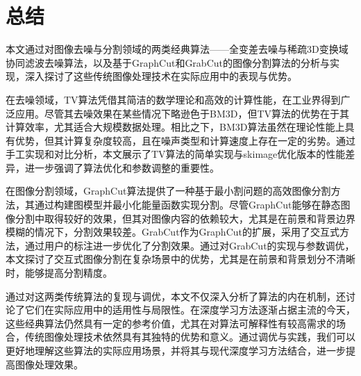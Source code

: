 \documentclass[UTF8]{ctexart}
\begin{document}
\section{总结}
本文通过对图像去噪与分割领域的两类经典算法——全变差去噪与稀疏3D变换域协同滤波去噪算法，以及基于GraphCut和GrabCut的图像分割算法的分析与实现，深入探讨了这些传统图像处理技术在实际应用中的表现与优势。\par
在去噪领域，TV算法凭借其简洁的数学理论和高效的计算性能，在工业界得到广泛应用。尽管其去噪效果在某些情况下略逊色于BM3D，但TV算法的优势在于其计算效率，尤其适合大规模数据处理。相比之下，BM3D算法虽然在理论性能上具有优势，但其计算复杂度较高，且在噪声类型和计算速度上存在一定的劣势。通过手工实现和对比分析，本文展示了TV算法的简单实现与skimage优化版本的性能差异，进一步强调了算法优化和参数调整的重要性。\par
在图像分割领域，GraphCut算法提供了一种基于最小割问题的高效图像分割方法，其通过构建图模型并最小化能量函数实现分割。尽管GraphCut能够在静态图像分割中取得较好的效果，但其对图像内容的依赖较大，尤其是在前景和背景边界模糊的情况下，分割效果较差。GrabCut作为GraphCut的扩展，采用了交互式方法，通过用户的标注进一步优化了分割效果。通过对GrabCut的实现与参数调优，本文探讨了交互式图像分割在复杂场景中的优势，尤其是在前景和背景划分不清晰时，能够提高分割精度。\par
通过对这两类传统算法的复现与调优，本文不仅深入分析了算法的内在机制，还讨论了它们在实际应用中的适用性与局限性。在深度学习方法逐渐占据主流的今天，这些经典算法仍然具有一定的参考价值，尤其在对算法可解释性有较高需求的场合，传统图像处理技术依然具有其独特的优势和意义。通过调优与实践，我们可以更好地理解这些算法的实际应用场景，并将其与现代深度学习方法结合，进一步提高图像处理效果。


\end{document}
